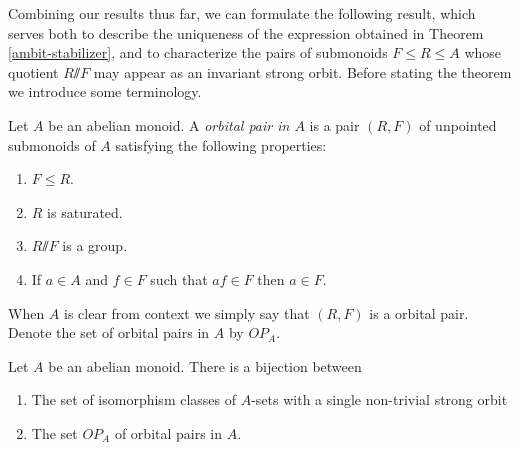 \documentclass[11pt]{amsart}
\renewcommand{\ss}{\mathord{\sslash}}
\begin{document}
Combining our results thus far, we can formulate the following result, which serves both to describe the uniqueness of the expression obtained in Theorem \ref{ambit-stabilizer}, and to characterize the pairs of submonoids $F\leq R\leq A$ whose quotient $R\ss F$ may appear as an invariant strong orbit.  Before stating the theorem we introduce some terminology.

\begin{definition} \label{def:OP}
Let $A$ be an abelian monoid.
    A \emph{orbital pair in $A$} is a pair $(R,F)$ of unpointed submonoids of $A$ satisfying the following properties:
    \begin{enumerate}
        \item $F \leq R$.
        \item $R$ is saturated.
        \item  $R \ss F$ is a group.
        \item  If $a\in A$ and $f\in F$ such that $af\in F$ then $a\in F$.
    \end{enumerate}
    When $A$ is clear from context we simply say that $(R,F)$ is a orbital pair.  Denote the set of orbital pairs in $A$ by $OP_A$.
\end{definition}

\begin{theorem}\label{thm.uniqueness}
   Let $A$ be an abelian monoid. There is a bijection between
    \begin{enumerate}
        \item The set of isomorphism classes of $A$-sets with a single non-trivial strong orbit
        \item The set $OP_A$ of orbital pairs in $A$. %
    \end{enumerate}
\end{theorem}
\end{document}
